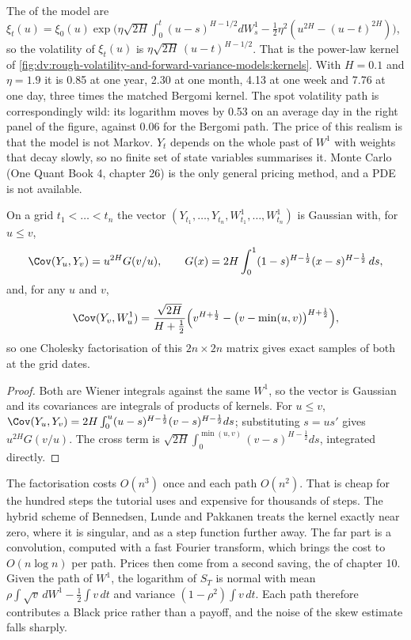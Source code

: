The  of the model are
$\xi_t(u)=\xi_0(u)\exp\bigl(\eta\sqrt{2H}\int_0^t(u-s)^{H-1/2}dW^1_s-\frac12\eta^2(u^{2H}-(u-t)^{2H})\bigr)$,
so the volatility of $\xi_t(u)$ is $\eta\sqrt{2H}\,(u-t)^{H-1/2}$. That is the power-law kernel of
\cref{fig:dv:rough-volatility-and-forward-variance-models:kernels}. With $H=0.1$ and $\eta=1.9$ it is 0.85 at one
year, 2.30 at one month, 4.13 at one week and 7.76 at one day, three times the matched Bergomi kernel. The spot
volatility path is correspondingly wild: its logarithm moves by 0.53 on an average day in the right panel of the
figure, against 0.06 for the Bergomi path. The price of this realism is that the model is not Markov. $Y_t$
depends on the whole past of $W^1$ with weights that decay slowly, so no finite set of state variables
summarises it. Monte Carlo (One Quant Book 4, chapter 26) is the only general pricing method, and a PDE is
not available.

\begin{proposition}\label{prop:dv:rough-volatility-and-forward-variance-models:sim}
On a grid $t_1<\dots<t_n$ the vector $(Y_{t_1},\dots,Y_{t_n},W^1_{t_1},\dots,W^1_{t_n})$ is Gaussian with, for
$u\le v$,
\[
\Cov(Y_u,Y_v)=u^{2H}G(v/u),\qquad G(x)=2H\int_0^1(1-s)^{H-\frac12}(x-s)^{H-\frac12}\,ds,
\]
and, for any $u$ and $v$,
\[
\Cov(Y_v,W^1_u)=\frac{\sqrt{2H}}{H+\frac12}\Bigl(v^{H+\frac12}-\bigl(v-\min(u,v)\bigr)^{H+\frac12}\Bigr),
\]
so one Cholesky factorisation of this $2n\times2n$ matrix gives exact samples of both at the grid dates.
\end{proposition}
\begin{proof}
Both are Wiener integrals against the same $W^1$, so the vector is Gaussian and its covariances are integrals
of products of kernels. For $u\le v$,
$\Cov(Y_u,Y_v)=2H\int_0^u(u-s)^{H-\frac12}(v-s)^{H-\frac12}ds$; substituting $s=us'$ gives $u^{2H}G(v/u)$.
The cross term is $\sqrt{2H}\int_0^{\min(u,v)}(v-s)^{H-\frac12}ds$, integrated directly.
\end{proof}

The factorisation costs $O(n^3)$ once and each path $O(n^2)$. That is cheap for the hundred steps the
tutorial uses and expensive for thousands of steps. The hybrid scheme of Bennedsen, Lunde and Pakkanen treats
the kernel exactly near zero, where it is singular, and as a step function further away. The far part is a
convolution, computed with a fast Fourier transform, which brings the cost to $O(n\log n)$ per path. Prices
then come from a second saving, the  of chapter 10. Given the path of $W^1$, the logarithm of
$S_T$ is normal with mean $\rho\int\sqrt v\,dW^1-\frac12\int v\,dt$ and variance $(1-\rho^2)\int v\,dt$. Each
path therefore contributes a Black price rather than a payoff, and the noise of the skew estimate falls
sharply.

